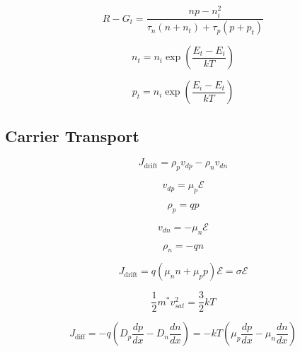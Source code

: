 \documentclass{infosheet}
\begin{document}
\begin{displaymath}
  R-G_t = \frac{np-n_i^2}{\tau_n(n+n_t) + \tau_p(p+p_t)}
\end{displaymath}

\begin{multicols}{2}
  \begin{displaymath}
    n_t = n_i\exp\left(\frac{E_t-E_i}{kT}\right)
  \end{displaymath}
  
  \begin{displaymath}
    p_t = n_i\exp\left(\frac{E_i-E_t}{kT}\right)
  \end{displaymath}
\end{multicols}

\subsection{Carrier Transport}

\begin{displaymath}
  J_\text{drift} = \rho_p v_{dp} - \rho_n v_{dn}
\end{displaymath}

\begin{multicols}{2}
  \begin{displaymath}
    v_{dp} = \mu_p\mathcal{E}
  \end{displaymath}
  
  \begin{displaymath}
    \rho_p = qp
  \end{displaymath}

  \begin{displaymath}
    v_{dn} = -\mu_n\mathcal{E}
  \end{displaymath}
  
  \begin{displaymath}
    \rho_n = -qn
  \end{displaymath}
\end{multicols}

\begin{displaymath}
  J_\text{drift} = q(\mu_nn + \mu_pp)\mathcal{E} = \sigma\mathcal{E}
\end{displaymath}

\begin{displaymath}
  \frac{1}{2}m^*v_{sat}^2 = \frac{3}{2}kT
\end{displaymath}

\begin{displaymath}
  J_\text{diff} = -q\left(D_p\frac{dp}{dx} - D_n\frac{dn}{dx}\right) = -kT\left(\mu_p\frac{dp}{dx} - \mu_n\frac{dn}{dx}\right)
\end{displaymath}
\end{document}
